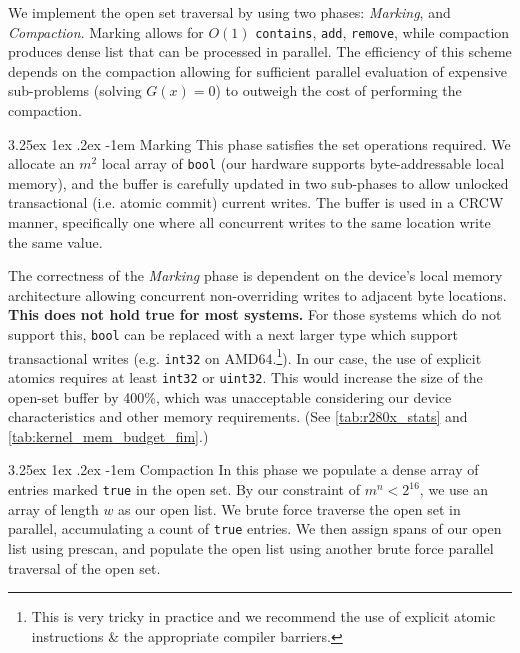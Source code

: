 \documentclass[11pt]{article}       %
\makeatletter
\newcounter{subsubsubsection}[subsubsection]
\renewcommand\paragraph{\@startsection{paragraph}{5}{\z@}%
	{3.25ex \@plus1ex \@minus.2ex}%
	{-1em}%
	{\normalfont\normalsize\bfseries}}
\makeatother
\begin{document}
We implement the open set traversal by using two phases: \textit{Marking}, and \textit{Compaction}. Marking allows for $O(1)$ \texttt{contains}, \texttt{add}, \texttt{remove}, while compaction produces dense list that can be processed in parallel. The efficiency of this scheme depends on the compaction allowing for sufficient parallel evaluation of expensive sub-problems (solving $G(x) = 0$) to outweigh the cost of performing the compaction.

\paragraph{Marking}
This phase satisfies the set operations required. We allocate an $m^2$ local array of \texttt{bool} (our hardware supports byte-addressable local memory), and the buffer is carefully updated in two sub-phases to allow unlocked transactional (i.e. atomic commit) current writes. The buffer is used in a CRCW manner, specifically one where all concurrent writes to the same location write the same value.

The correctness of the \textit{Marking} phase is dependent on the device's local memory architecture allowing concurrent non-overriding writes to adjacent byte locations. \textbf{This does not hold true for most systems.} For those systems which do not support this, \texttt{bool} can be replaced with a next larger type which support transactional writes (e.g. \texttt{int32} on AMD64.\footnote{This is very tricky in practice and we recommend the use of explicit atomic instructions \& the appropriate compiler barriers.}). In our case, the use of explicit atomics requires at least \texttt{int32} or \texttt{uint32}. This would increase the size of the open-set buffer by 400\%, which was unacceptable considering our device characteristics and other memory requirements. (See \autoref{tab:r280x_stats} and \autoref{tab:kernel_mem_budget_fim}.)

\paragraph{Compaction}
In this phase we populate a dense array of entries marked \texttt{true} in the open set. By our constraint of $m^n < 2^{16}$, we use an  array of length $w$ as our open list. We brute force traverse the open set in parallel, accumulating a count of \texttt{true} entries. We then assign spans of our open list using prescan, and populate the open list using another brute force parallel traversal of the open set.
\end{document}
